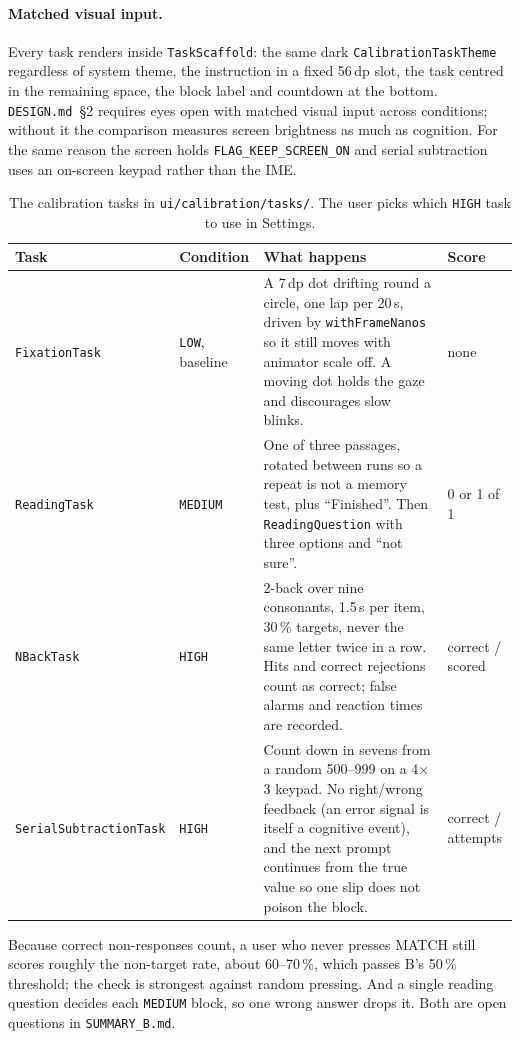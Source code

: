 \documentclass[10pt,a4paper]{article}
\newcommand{\file}[1]{\texttt{\small #1}}          %
\newcommand{\code}[1]{\texttt{#1}}                  %
\begin{document}
\paragraph{Matched visual input.} Every task renders inside \code{TaskScaffold}: the same dark
\code{CalibrationTaskTheme} regardless of system theme, the instruction in a fixed 56\,dp slot, the
task centred in the remaining space, the block label and countdown at the bottom. \file{DESIGN.md}~\S2
requires eyes open with matched visual input across conditions; without it the comparison
measures screen brightness as much as cognition. For the same reason the screen holds
\code{FLAG\_KEEP\_SCREEN\_ON} and serial subtraction uses an on-screen keypad rather than the IME.

\begin{table}[htbp]\centering\small
\begin{tabularx}{\textwidth}{@{}l l X l@{}}
\toprule
\textbf{Task} & \textbf{Condition} & \textbf{What happens} & \textbf{Score} \\
\midrule
\code{FixationTask} & \code{LOW}, baseline & A 7\,dp dot drifting round a circle, one lap per 20\,s,
  driven by \code{withFrameNanos} so it still moves with animator scale off. A moving dot holds the
  gaze and discourages slow blinks. & none \\
\code{ReadingTask} & \code{MEDIUM} & One of three passages, rotated between runs so a repeat is not a
  memory test, plus ``Finished''. Then \code{ReadingQuestion} with three options and ``not sure''. &
  0 or 1 of 1 \\
\code{NBackTask} & \code{HIGH} & 2-back over nine consonants, 1.5\,s per item, 30\,\% targets, never
  the same letter twice in a row. Hits and correct rejections count as correct; false alarms and
  reaction times are recorded. & correct / scored \\
\code{SerialSubtractionTask} & \code{HIGH} & Count down in sevens from a random 500--999 on a 4$\times$3
  keypad. No right/wrong feedback (an error signal is itself a cognitive event), and the next prompt
  continues from the true value so one slip does not poison the block. & correct / attempts \\
\bottomrule
\end{tabularx}
\caption{The calibration tasks in \file{ui/calibration/tasks/}. The user picks which
\code{HIGH} task to use in Settings.}\label{tab:tasks}
\end{table}

\begin{gotcha}
Because correct non-responses count, a user who never presses MATCH still scores roughly the
non-target rate, about 60--70\,\%, which passes B's 50\,\% threshold; the check is strongest against
random pressing. And a single reading question decides each \code{MEDIUM} block, so one wrong
answer drops it. Both are open questions in \file{SUMMARY\_B.md}.
\end{gotcha}
\end{document}
